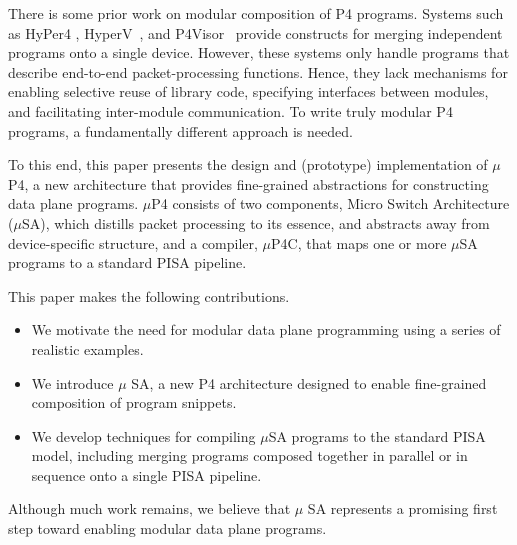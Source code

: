 \documentclass{hotnets19}
\begin{document}
There is some prior work on modular composition of P4 programs.
Systems such as HyPer4 \cite{Hancock:2016:HUP:2999572.2999607},
HyperV~\cite{8038396}, and
P4Visor~\cite{Zheng:2018:PLV:3281411.3281436} provide constructs for
merging independent programs onto a single device. However, these
systems only handle programs that describe end-to-end
packet-processing functions. Hence, they lack mechanisms for enabling
selective reuse of library code, specifying interfaces between
modules, and facilitating inter-module communication. To write truly
modular P4 programs, a fundamentally different approach is needed.

To this end, this paper presents the design and (prototype)
implementation of $\mu$P4, a new architecture that provides
fine-grained abstractions for constructing data plane programs.
$\mu$P4 consists of two components, Micro Switch Architecture
($\mu$SA), which distills packet processing to its essence, and
abstracts away from device-specific structure, and a compiler,
$\mu$P4C, that maps one or more $\mu$SA programs to a standard PISA
pipeline. 

This paper makes the following contributions.
\begin{itemize}
\item We motivate the need for modular data plane programming using a
  series of realistic examples.
\item We introduce $\mu$ SA, a new P4 architecture designed to enable
  fine-grained composition of program snippets.
\item We develop techniques for compiling $\mu$SA programs to the
  standard PISA model, including merging programs composed together in
  parallel or in sequence onto a single PISA pipeline.
\end{itemize}

Although much work remains, we believe that $\mu$ SA represents a
promising first step toward enabling modular data plane programs.

\end{document}
